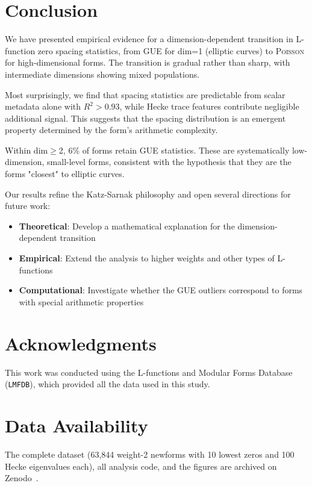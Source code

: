 \documentclass[11pt, a4paper]{article}
\newcommand{\GUE}{\textsc{GUE}}
\newcommand{\Poisson}{\textsc{Poisson}}
\newcommand{\LMFDB}{\texttt{LMFDB}}
\begin{document}
\section{Conclusion}
\label{sec:conclusion}

We have presented empirical evidence for a dimension-dependent transition in L-function zero spacing statistics, from \GUE{} for dim=1 (elliptic curves) to \Poisson{} for high-dimensional forms. The transition is gradual rather than sharp, with intermediate dimensions showing mixed populations.

Most surprisingly, we find that spacing statistics are predictable from scalar metadata alone with $R^2>0.93$, while Hecke trace features contribute negligible additional signal. This suggests that the spacing distribution is an emergent property determined by the form's arithmetic complexity.

Within dim$\geq$2, 6\% of forms retain \GUE{} statistics. These are systematically low-dimension, small-level forms, consistent with the hypothesis that they are the forms "closest" to elliptic curves.

Our results refine the Katz-Sarnak philosophy and open several directions for future work:
\begin{itemize}
\item {\bfseries Theoretical}: Develop a mathematical explanation for the dimension-dependent transition
\item {\bfseries Empirical}: Extend the analysis to higher weights and other types of L-functions
\item {\bfseries Computational}: Investigate whether the \GUE{} outliers correspond to forms with special arithmetic properties
\end{itemize}

\section*{Acknowledgments}

This work was conducted using the L-functions and Modular Forms Database (\LMFDB{}), which provided all the data used in this study.

\section*{Data Availability}

The complete dataset (63,844 weight-2 newforms with 10 lowest zeros and 100 Hecke eigenvalues each), all analysis code, and the figures are archived on Zenodo~\cite{zenodo2026}.



\end{document}

